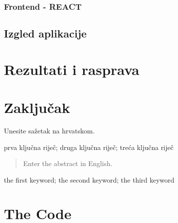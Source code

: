 \documentclass[zavrsnirad]{fer}
\begin{document}
\subsection{Frontend - REACT}
\label{sec:frontend}

\section{Izgled aplikacije}


\chapter{Rezultati i rasprava}
\label{pog:rezultati_i_rasprava}


\chapter{Zaključak}
\label{pog:zakljucak}




\nocite{*}




\begin{sazetak}
  Unesite sažetak na hrvatskom.

  \blindtext
\end{sazetak}

\begin{kljucnerijeci}
  prva ključna riječ; druga ključna riječ; treća ključna riječ
\end{kljucnerijeci}


\begin{abstract}
  Enter the abstract in English.
  
  \blindtext 
\end{abstract}

\begin{keywords}
  the first keyword; the second keyword; the third keyword
\end{keywords}



\backmatter

\chapter{The Code}
\end{document}
